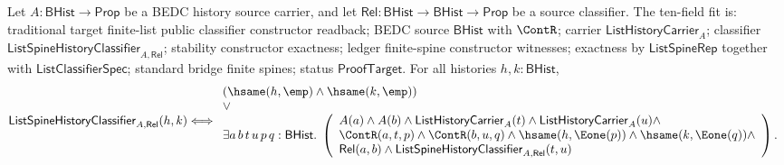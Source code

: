 \begin{theorem}
\label{thm:list-public-classifier-constructor-exactness}
Let $A:\mathsf{BHist}\to\mathsf{Prop}$ be a BEDC history source carrier, and let
$\mathsf{Rel}:\mathsf{BHist}\to\mathsf{BHist}\to\mathsf{Prop}$ be a source
classifier. The ten-field fit is: traditional target finite-list public
classifier constructor readback; BEDC source $\mathsf{BHist}$ with $\ContR$;
carrier $\mathsf{ListHistoryCarrier}_A$; classifier
$\mathsf{ListSpineHistoryClassifier}_{A,\mathsf{Rel}}$; stability constructor
exactness; ledger finite-spine constructor witnesses; exactness by
$\mathsf{ListSpineRep}$ together with $\mathsf{ListClassifierSpec}$; standard
bridge finite spines; status $\mathsf{ProofTarget}$. For all histories
$h,k:\mathsf{BHist}$,
$$
\mathsf{ListSpineHistoryClassifier}_{A,\mathsf{Rel}}(h,k)
\Longleftrightarrow
\begin{array}{l}
(\hsame(h,\emp)\land \hsame(k,\emp))\\
\lor\\
\exists a\,b\,t\,u\,p\,q:\mathsf{BHist}.\;
\left(
\begin{array}{l}
A(a)\land A(b)\land
\mathsf{ListHistoryCarrier}_A(t)\land
\mathsf{ListHistoryCarrier}_A(u)\land\\
\ContR(a,t,p)\land \ContR(b,u,q)\land
\hsame(h,\Eone(p))\land \hsame(k,\Eone(q))\land\\
\mathsf{Rel}(a,b)\land
\mathsf{ListSpineHistoryClassifier}_{A,\mathsf{Rel}}(t,u)
\end{array}
\right).
\end{array}
$$
\end{theorem}
